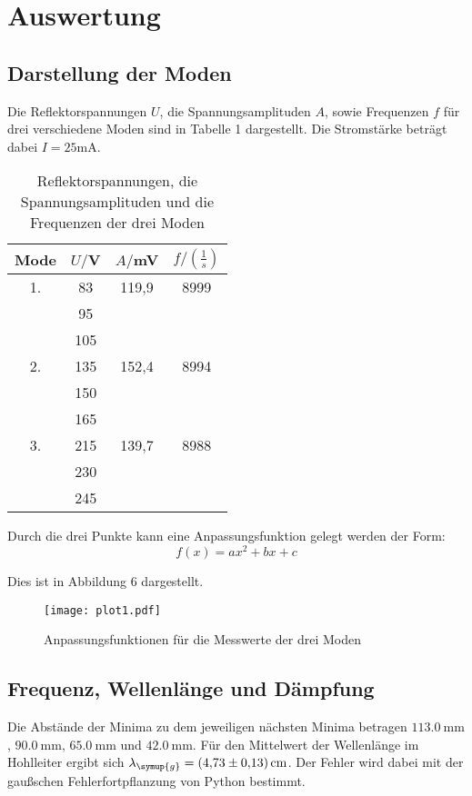\section{Auswertung}
\label{sec:Auswertung}

\subsection{Darstellung der Moden}
Die Reflektorspannungen $U$, die Spannungsamplituden $A$, sowie Frequenzen $f$ für drei verschiedene Moden sind in Tabelle 1 dargestellt.
Die Stromstärke beträgt dabei $I = 25$mA.



\begin{table}[H]
  \centering
  \caption{Reflektorspannungen, die Spannungsamplituden und die Frequenzen der drei Moden}
  \label{tab:Parameter}
  \begin{tabular}{c c c c}
    \toprule
    Mode & $U/$V & $A/$mV& $f/\left(\frac{1}{s}\right)$\\
    \midrule
    1. & 83  &   119,9& 8999 \\
       & 95  & &       \\
       & 105 & &       \\
    2. & 135 &    152,4 & 8994 \\
       & 150 & & \\
       & 165 & & \\
    3. & 215 &  139,7  & 8988 \\
       & 230 & & \\
       & 245 & & \\
    \bottomrule
  \end{tabular}
\end{table}

Durch die drei Punkte kann eine Anpassungsfunktion gelegt werden der Form:
\begin{equation*}
  f(x)=ax^2+bx+c
\end{equation*}

Dies ist in Abbildung 6 dargestellt.
\begin{figure}
  \centering
  \texttt{[image: plot1.pdf]}
  \caption{Anpassungsfunktionen für die Messwerte der drei Moden}
  \label{fig:plot}
\end{figure}



\subsection{Frequenz, Wellenlänge und Dämpfung}
Die Abstände der Minima zu dem jeweiligen nächsten Minima betragen $\SI{113.0}{\milli\meter}$, $\SI{90.0}{\milli\meter}$,
$\SI{65.0}{\milli\meter}$ und $\SI{42.0}{\milli\meter}$.
Für den Mittelwert der Wellenlänge im Hohlleiter ergibt sich $\lambda_{\symup{g}} =\SI{4.73(13)}{\centi\meter}$.
Der Fehler wird dabei mit der gaußschen Fehlerfortpflanzung von Python \cite{uncertainties} bestimmt.

